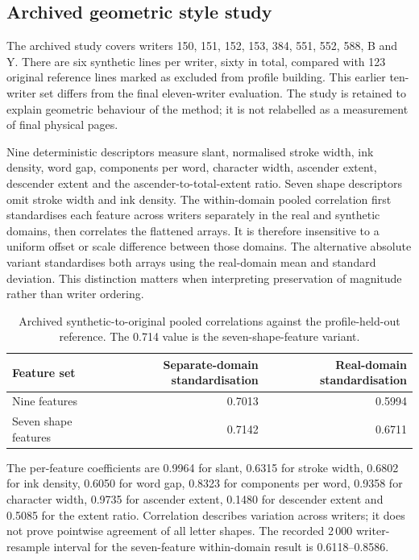\subsection{Archived geometric style study}
\label{app:res-style}
The archived study covers writers 150, 151, 152, 153, 384, 551, 552, 588, B and Y. There are six synthetic lines per writer, sixty in total, compared with 123 original reference lines marked as excluded from profile building. This earlier ten-writer set differs from the final eleven-writer evaluation. The study is retained to explain geometric behaviour of the method; it is not relabelled as a measurement of final physical pages.

Nine deterministic descriptors measure slant, normalised stroke width, ink density, word gap, components per word, character width, ascender extent, descender extent and the ascender-to-total-extent ratio. Seven shape descriptors omit stroke width and ink density. The within-domain pooled correlation first standardises each feature across writers separately in the real and synthetic domains, then correlates the flattened arrays. It is therefore insensitive to a uniform offset or scale difference between those domains. The alternative absolute variant standardises both arrays using the real-domain mean and standard deviation. This distinction matters when interpreting preservation of magnitude rather than writer ordering.

\begin{table}[!htbp]\centering\small
\begin{tabular}{lrr}\toprule
\textbf{Feature set} & \textbf{Separate-domain standardisation} & \textbf{Real-domain standardisation}\\\midrule
Nine features & 0.7013 & 0.5994\\
Seven shape features & 0.7142 & 0.6711\\\bottomrule
\end{tabular}
\caption{Archived synthetic-to-original pooled correlations against the profile-held-out reference. The 0.714 value is the seven-shape-feature variant.}\label{tab:app-style-variants}\end{table}

The per-feature coefficients are 0.9964 for slant, 0.6315 for stroke width, 0.6802 for ink density, 0.6050 for word gap, 0.8323 for components per word, 0.9358 for character width, 0.9735 for ascender extent, 0.1480 for descender extent and 0.5085 for the extent ratio. Correlation describes variation across writers; it does not prove pointwise agreement of all letter shapes. The recorded 2\,000 writer-resample interval for the seven-feature within-domain result is 0.6118--0.8586.

